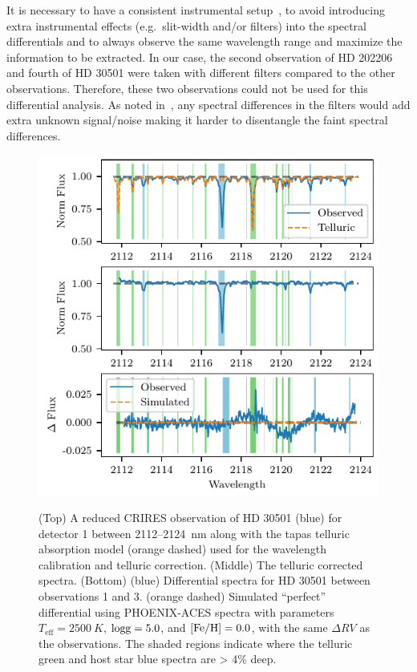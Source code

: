    It is necessary to have a consistent instrumental setup~\citet{ferluga_separating_1997}, to avoid introducing extra instrumental effects (e.g.\ slit-width and/or filters) into the spectral differentials and to always observe the same wavelength range and maximize the information to be extracted. In our case, the second observation of {HD 202206} and fourth of {HD 30501} were taken with different filters compared to the other observations. Therefore, these two observations could not be used for this differential analysis. As noted in~\citep{hadrava_disentangling_2009}, any spectral differences in the filters would add extra unknown signal/noise making it harder to disentangle the faint spectral differences.


    \begin{figure}
        \includegraphics[width=\hsize]{figures/direct-recovery/differential.pdf}\\
        \caption{ (Top) A reduced CRIRES observation of {HD 30501} (blue) for detector 1 between 2112--2124~nm along with the tapas telluric absorption model ({orange} dashed) used for the wavelength calibration and telluric correction. (Middle) The telluric corrected spectra. (Bottom) ({blue}) Differential spectra for {HD 30501} between observations 1 and 3. ({orange} dashed) Simulated ``perfect'' differential using PHOENIX-ACES spectra with parameters \(T_{\textrm{eff}} = 2500~K \), \(\rm logg=5.0\), and \(\rm [Fe/H]=0.0 \), with the same \(\Delta RV \) as the observations. The shaded regions indicate where the telluric {green} and host star {blue} spectra are > 4\% deep.}
        \label{fig:spectral_example}
    \end{figure}

